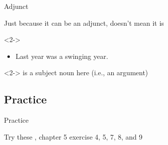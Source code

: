 \documentclass{beamer}
\newcommand{\subonefive}{Adjunct}
\newcommand{\subonesix}{Practice}
\begin{document}
      \begin{frame}{\subonefive}
        \begin{alertblock}{}
          Just because it can be an adjunct, doesn't mean it is
        \end{alertblock}
        \begin{example}<2->
          \begin{itemize}
            \item Last year was a swinging year.
          \end{itemize}
        \end{example}
        \begin{block}<2->{}
           is a subject noun here (i.e., an argument)
        \end{block}
      \end{frame}


    \subsection{\subonesix}
      \begin{frame}{\subonesix}
        \begin{block}{Try these}
          \textcite{dawson_language_2016}, chapter 5 exercise 4, 5, 7, 8, and 9
        \end{block}
      \end{frame}
\end{document}
